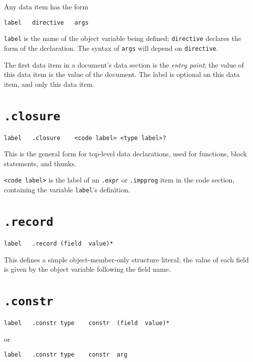 \documentclass{report}
\newcommand\stringcode[1]{\texttt{#1}}
\begin{document}
Any data item has the form
\begin{verbatim}
label	directive	args
\end{verbatim}
\stringcode{label} is the name of the object variable being defined;
\stringcode{directive} declares the form of the declaration.
The syntax of \stringcode{args} will depend on \stringcode{directive}.

The first data item in a document's data section is the \emph{entry point};
the value of this data item is the value of the document.
The label is optional on this data item, and only this data item.

\section{\stringcode{.closure}}

\begin{verbatim}
label	.closure	<code label> <type label>?
\end{verbatim}

This is the general form for top-level data declarations,
used for functions, block statements, and thunks.

\stringcode{<code label>} is the label of an \stringcode{.expr} or \stringcode{.impprog} item in the code section,
containing the variable \stringcode{label}'s definition.

\section{\stringcode{.record}}

\begin{verbatim}
label	.record	(field	value)*
\end{verbatim}

This defines a simple object-member-only structure literal;
the value of each field is given by the object variable following the field name.

\section{\stringcode{.constr}}

\begin{verbatim}
label	.constr	type	constr	(field	value)*
\end{verbatim}
or
\begin{verbatim}
label	.constr	type	constr	arg
\end{verbatim}
\end{document}
